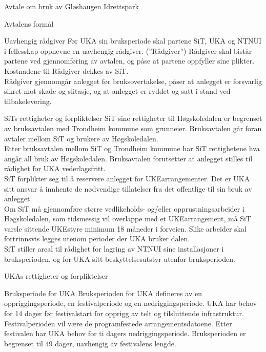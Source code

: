 \begin{instruks}{Avtale om bruk av Gløshaugen Idrettspark}
\begin{instruksledd}{Avtalens formål}
\begin{instruksledd}{Uavhengig rådgiver}
Før UKA sin bruksperiode skal partene SiT, UKA og NTNUI i fellesskap oppnevne en uavhengig rådgiver. (”Rådgiver”)  Rådgiver skal bistår partene ved gjennomføring av avtalen, og påse at partene oppfyller sine plikter. Kostnadene til Rådgiver dekkes av SiT.\\  

Rådgiver gjennomgår anlegget før bruksovertakelse, påser at anlegget er forsvarlig sikret mot skade og slitasje, og at anlegget er ryddet og satt i stand ved tilbakelevering.\\
\end{instruksledd}
 
\begin{instruksledd}{SiTs rettigheter og forpliktelser}
SiT sine rettigheter til Høgskoledalen er begrenset av bruksavtalen med Trondheim kommune som grunneier. Bruksavtalen går foran avtaler mellom SiT og brukere av Høgskoledalen.\\

Etter bruksavtalen mellom SiT og Trondheim kommune har SiT rettighetene hva angår all bruk av Høgskoledalen. Bruksavtalen forutsetter at anlegget stilles til rådighet for UKA vederlagsfritt.\\

SiT forplikter seg til å reservere anlegget for UKEarrangementer. Det er UKA sitt ansvar å innhente de nødvendige tillatelser fra det offentlige til sin bruk av anlegget.\\

Om SiT må gjennomføre større vedlikeholds- og/eller opprustningsarbeider i Høgskoledalen, som tidsmessig vil overlappe med et UKEarrangement, må SiT varsle sittende UKEstyre minimum 18 måneder i forveien. Slike arbeider skal fortrinnsvis legges utenom perioder der UKA bruker dalen.\\

SiT stiller areal til rådighet for lagring av NTNUI sine installasjoner i bruksperioden, og for UKA sitt beskyttelsesutstyr utenfor bruksperioden.\\
\end{instruksledd}

\begin{instruksledd}{UKAs rettigheter og forpliktelser}
\end{instruksledd}

\begin{instruksledd}{Bruksperiode for UKA}
Bruksperioden for UKA defineres av en oppriggingsperiode, en festivalperiode og en nedriggingsperiode. UKA har behov for 14 dager før festivalstart for opprigg av telt og tilsluttende infrastruktur. Festivalperioden vil være de programfestede arrangementsdatoene. Etter festivalen har UKA behov for ti dagers nedriggingsperiode.  Bruksperioden er begrenset til 49 dager, uavhengig av festivalens lengde.\\


\end{instruksledd}
\end{instruksledd}
\end{instruks}
